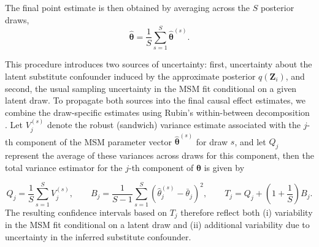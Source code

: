 The final point estimate is then obtained by averaging across the $S$ posterior draws,
\[
\hat{\boldsymbol{\theta}} = \frac{1}{S}\sum_{s=1}^{S}\hat{\boldsymbol{\theta}}^{(s)}.
\]

This procedure introduces two sources of uncertainty: first, uncertainty about the
latent substitute confounder induced by the approximate posterior $q(\mathbf{Z}_i)$, and second,
the usual sampling uncertainty in the MSM fit conditional on a given latent draw. To
propagate both sources into the final causal effect estimates, we combine the
draw-specific estimates using Rubin's within-between decomposition \cite{rubinMultipleImputationNonresponse2009}. 
Let
$V_{j}^{(s)}$ denote the robust (sandwich) variance 
estimate associated with the $j$-th component of the 
MSM parameter vector $\hat{\boldsymbol{\theta}}^{(s)}$ for draw $s$, 
and let $Q_j$ represent the average of these variances across 
draws for this component, 
then the total variance estimator for 
the $j$-th component of $\hat{\boldsymbol{\theta}}$ is given by

\[
Q_j = \frac{1}{S}\sum_{s=1}^{S} V_{j}^{(s)},
\qquad
B_j = \frac{1}{S - 1}\sum_{s=1}^{S}\left(\hat{\theta}_j^{(s)} - \bar{\theta}_j\right)^2,
\qquad
T_j = Q_j + \left(1+\frac{1}{S}\right)B_j.
\]
The resulting confidence intervals based on $T_j$ therefore reflect both
(i) variability in the MSM fit conditional on a latent draw and
(ii) additional variability due to uncertainty in the inferred substitute confounder.





